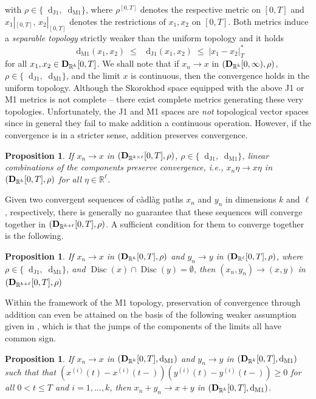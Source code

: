 \documentclass[11pt]{article}
\newtheorem{prop}[theorem]{Proposition}
\theoremstyle{definition}\newtheorem{example}[theorem]{Example}
\theoremstyle{definition}\newtheorem{counterexample}[theorem]{Counterexample}
\theoremstyle{definition}\newtheorem{remark}[theorem]{Remark}
\theoremstyle{definition}\newtheorem{defi}[theorem]{Definition}
\numberwithin{equation}{section}
\newcommand{\R}{\mathbb{R}}
\newcommand{\D}{{\bf D}}											%
\newcommand*\diff{\mathop{}\!\mathrm{d}}								%
\renewcommand{\|}{\; : \, \;}											%
\newcommand{\dJ}{\diff_{\operatorname{J1}}}								%
\newcommand{\dM}{\diff_{\operatorname{M1}}}							%
\begin{document}
with $\rho \in \{\dJ, \dM\}$, where $ \rho^{[0,T]}$ denotes the respective metric on $[0,T]$ and $x_1|_{[0,T]}, \,x_2|_{[0,T]}$ denotes the restrictions of $x_1,x_2$ on $[0,T]$.  Both metrics induce a \emph{separable topology} strictly weaker than the uniform topology and it holds
$$ \dM(x_1, x_2) \; \le \; \dJ(x_1, x_2) \; \le \; |x_1 - x_2|^*_T$$
for all $x_1, x_2 \in \D_{\R^k}[0,T]$. We shall note that if $x_n \to x$ in $(\D_{\R^k}[0,\infty), \rho)$, $\rho \in \{\dJ, \dM\}$, and the limit $x$ is continuous, then the convergence holds in the uniform topology.
Although the Skorokhod space equipped with the above J1 or M1 metrics is not complete -- there exist complete metrics generating these very topologies. Unfortunately, the J1 and M1 spaces are \emph{not} topological vector spaces since in general they fail to make addition a continuous operation. However, if the convergence is in a stricter sense, addition preserves convergence.
\begin{prop} \label{prop:A3}
	If $x_n \to x$ in $(\D_{\R^{k \times \ell }}[0,T], \rho)$, $\rho \in \{ \dJ, \dM\}$, linear combinations of the components preserve convergence, i.e., $x_n \eta \to x \eta$ in $(\D_{\R^k}[0,T], \rho)$ for all $\eta \in \R^\ell $.
\end{prop}
Given two convergent sequences of c\`adl\`ag paths $x_n$ and $y_n$ in dimensions $k$ and $\ell$, respectively, there is generally no guarantee that these sequences will converge together in $(\D_{\R^{k+\ell}}[0,T], \rho)$. A sufficient condition for them to converge together is the following.
\begin{prop} \label{prop:A3}
	If $x_n \to x$ in $(\D_{\R^{k}}[0,T], \rho)$ and $y_n \to y$ in $(\D_{\R^{\ell}}[0,T], \rho)$, where $\rho \in \{ \dJ, \dM\}$, and $\operatorname{Disc}(x) \cap \operatorname{Disc}(y) = \emptyset$, then $(x_n, y_n) \to (x,y)$ in $(\D_{\R^{k+\ell}}[0,T], \rho)$
\end{prop}
Within the framework of the M1 topology, preservation of convergence through addition can even be attained on the basis of the following weaker assumption given in \cite{whitt}, which is that the jumps of the components of the limits all have common sign.
\begin{prop} \label{prop:A4}
	If $x_n \to x$ in $(\D_{\R^{k}}[0,T], \dM)$ and $y_n \to y$ in $(\D_{\R^{k}}[0,T], \dM)$ such that that $(x^{(i)}(t) - x^{(i)}(t-)) (y^{(i)}(t) - y^{(i)}(t-)) \ge 0$ for all $0< t \le T$ and $i=1,...,k$, then $x_n+y_n \to x+y$ in $(\D_{\R^{k}}[0,T], \dM)$.
\end{prop}
\end{document}

